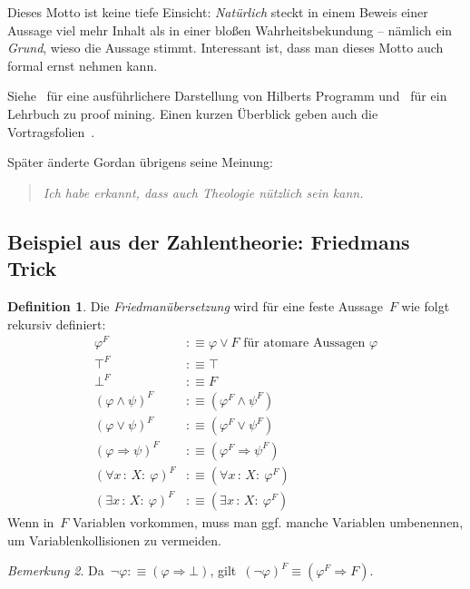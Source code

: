 \documentclass[a4paper,ngerman,12pt]{scrartcl}
\theoremstyle{definition}
\newtheorem{defn}{Definition}[section]
\theoremstyle{plain}
\theoremstyle{remark}
\newtheorem{bem}[defn]{Bemerkung}
\renewcommand{\_}{\mathpunct{.}\,}
\newcommand{\?}{\,{:}\,}
\begin{document}
Dieses Motto ist keine tiefe Einsicht: \emph{Natürlich} steckt in
einem Beweis einer Aussage viel mehr Inhalt als in einer bloßen
Wahrheitsbekundung -- nämlich ein \emph{Grund}, wieso die Aussage stimmt.
Interessant ist, dass man dieses Motto auch formal ernst nehmen kann.

Siehe~\cite{raatikainen:hilbert} für eine ausführlichere Darstellung von
Hilberts Programm und~\cite{kohlenbach:applprooftheory} für ein Lehrbuch zu
proof mining. Einen kurzen Überblick geben auch die
Vortragsfolien~\cite{avigad:proofmining}.

Später änderte Gordan übrigens seine Meinung:
\begin{quote}
\emph{Ich habe erkannt, dass auch Theologie nützlich sein kann.}
\end{quote}



\subsection{Beispiel aus der Zahlentheorie: Friedmans Trick}

\begin{defn}Die \emph{Friedmanübersetzung}
wird für eine feste Aussage~$F$ wie folgt rekursiv definiert:
\begin{align*}
  \varphi^F &:\equiv \varphi \vee F \text{ für atomare Aussagen~$\varphi$} \\
  \top^F &:\equiv \top \\
  \bot^F &:\equiv F \\
  (\varphi \wedge \psi)^F &:\equiv (\varphi^F \wedge \psi^F) \\
  (\varphi \vee \psi)^F &:\equiv (\varphi^F \vee \psi^F) \\
  (\varphi \Rightarrow \psi)^F &:\equiv (\varphi^F \Rightarrow \psi^F) \\
  (\forall x\?X{:}\ \varphi)^F &:\equiv (\forall x\?X{:}\ \varphi^F) \\
  (\exists x\?X{:}\ \varphi)^F &:\equiv (\exists x\?X{:}\ \varphi^F)
\end{align*}
Wenn in~$F$ Variablen vorkommen, muss man ggf. manche Variablen umbenennen, um
Variablenkollisionen zu vermeiden.
\end{defn}

\begin{bem}Da~$\neg\varphi :\equiv (\varphi \Rightarrow \bot)$,
gilt~$(\neg\varphi)^F \equiv (\varphi^F \Rightarrow F)$.\end{bem}
\end{document}
